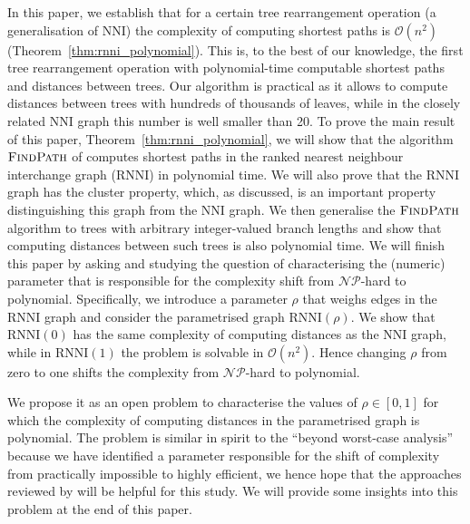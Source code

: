 \documentclass[11pt]{amsart}
\newcommand{\rnni}{\mathrm{RNNI}}
\newcommand{\findpath}{\textsc{FindPath}}
\newcommand{\nni}{\mathrm{NNI}}
\newcommand{\np}{\mathcal{NP}}
\renewcommand{\O}{\mathcal O}
\newcommand{\summary}[1]{} %
\begin{document}
\summary{Paper summary in light of motivation: We've discovered the first efficiently computable distance, given by a parameter range in known tree spaces, and want to understand the reason for the complexity jump -- cite ``Beyond worst-case complexity.''}
In this paper, we establish that for a certain tree rearrangement operation (a generalisation of $\nni$) the complexity of computing shortest paths is $\O(n^2)$ (Theorem~\ref{thm:rnni_polynomial}).
This is, to the best of our knowledge, the first tree rearrangement operation with polynomial-time computable shortest paths and distances between trees.
Our algorithm is practical as it allows to compute distances between trees with hundreds of thousands of leaves, while in the closely related $\nni$ graph this number is well smaller \autocite{Whidden2016-kl} than 20.
To prove the main result of this paper, Theorem~\ref{thm:rnni_polynomial}, we will show that the algorithm $\findpath$ of \textcite{Collienne2019-ca} computes shortest paths in the ranked nearest neighbour interchange graph ($\rnni$) in polynomial time.
We will also prove that the $\rnni$ graph has the cluster property, which, as discussed, is an important property distinguishing this graph from the $\nni$ graph.
We then generalise the $\findpath$ algorithm to trees with arbitrary integer-valued branch lengths and show that computing distances between such trees is also polynomial time.
We will finish this paper by asking and studying the question of characterising the (numeric) parameter that is responsible for the complexity shift from $\np$-hard to polynomial.
Specifically, we introduce a parameter $\rho$ that weighs edges in the $\rnni$ graph and consider the parametrised graph $\rnni(\rho)$.
We show that $\rnni(0)$ has the same complexity of computing distances as the $\nni$ graph, while in $\rnni(1)$ the problem is solvable in $\O(n^2)$.
Hence changing $\rho$ from zero to one shifts the complexity from $\np$-hard to polynomial.

We propose it as an open problem to characterise the values of $\rho \in [0,1]$ for which the complexity of computing distances in the parametrised graph is polynomial.
The problem is similar in spirit to the ``beyond worst-case analysis'' \autocite{Roughgarden2019-to} because we have identified a parameter responsible for the shift of complexity from practically impossible to highly efficient, we hence hope that the approaches reviewed by \textcite{Roughgarden2019-to} will be helpful for this study.
We will provide some insights into this problem at the end of this paper.
\end{document}
